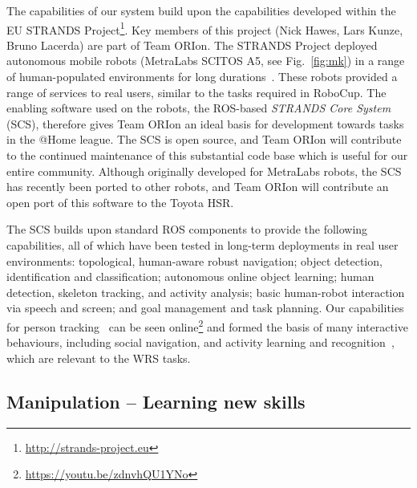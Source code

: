 \documentclass[runningheads,a4paper]{llncs}
\newcommand{\teamori}{Team ORIon}
\begin{document}
The capabilities of our system build upon the capabilities developed within the EU STRANDS Project\footnote{\url{http://strands-project.eu}}. Key members of this project (Nick Hawes, Lars Kunze, Bruno Lacerda) are part of \teamori. The STRANDS Project deployed autonomous mobile robots (MetraLabs SCITOS A5, see Fig.~\ref{fig:mk}) in a range of human-populated environments for long durations~\cite{strands@ram}. These robots provided a range of services to real users, similar to the tasks required in RoboCup. The enabling software used on the robots, the ROS-based \emph{STRANDS Core System} (SCS), therefore gives \teamori{} an ideal basis for development towards tasks in the @Home league. The SCS is open source, and \teamori{} will contribute to the continued maintenance of this substantial code base which is useful for our entire community. Although originally developed for MetraLabs robots, the SCS has recently been ported to other robots, and \teamori{} will contribute an open port of this software to the Toyota HSR. 

The SCS builds upon standard ROS components to provide the following capabilities, all of which have been tested in long-term deployments in real user environments: topological, human-aware robust navigation; object detection, identification and classification; autonomous online object learning; human detection, skeleton tracking, and activity analysis; basic human-robot interaction via speech and screen; and goal management and task planning. Our capabilities for person tracking~\cite{dondrup2015tracker} can be seen online\footnote{\url{https://youtu.be/zdnvhQU1YNo}} and formed the basis of many interactive behaviours, including social navigation, and activity learning and recognition~\cite{duckworth_aamas2016}, which are relevant to the WRS tasks. 


\subsection{Manipulation -- Learning new skills}
\end{document}
